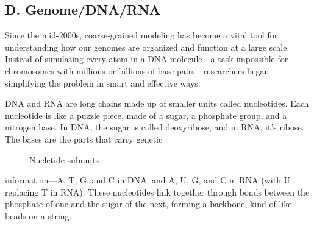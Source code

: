 \documentclass[12pt]{article}
\begin{document}
\begin{flushleft}
\subsection*{D. Genome/DNA/RNA}

Since the mid-2000s, coarse-grained modeling has become a vital tool for understanding how our genomes are organized and function at a large scale. Instead of simulating every atom in a DNA molecule—a task impossible for chromosomes with millions or billions of base pairs—researchers began simplifying the problem in smart and effective ways.

DNA and RNA are long chains made up of smaller units called nucleotides. Each nucleotide is like a puzzle piece, made of a sugar, a phosphate group, and a nitrogen base. In DNA, the sugar is called deoxyribose, and in RNA, it’s ribose. The bases are the parts that carry genetic 

\begin{figure}[!ht]
  \centering
  

  \caption{Nucletide subunits}
\end{figure}


\noindent information—A, T, G, and C in DNA, and A, U, G, and C in RNA (with U replacing T in RNA). These nucleotides link together through bonds between the phosphate of one and the sugar of the next, forming a backbone, kind of like beads on a string. 









\begin{figure}[!ht]
  \centering
  

\end{figure}
\end{flushleft}
\end{document}
